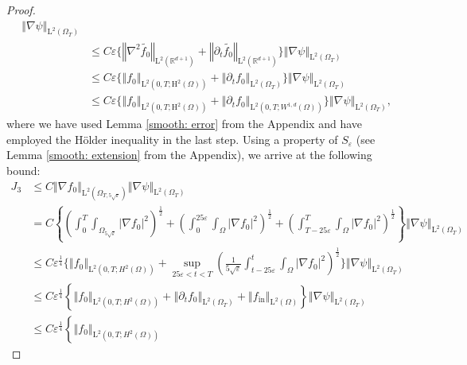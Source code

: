 \documentclass[preprint, 12pt]{amsart}
\numberwithin{equation}{section}
\numberwithin{equation}{section}
\newcommand\RR{\mathbb{R}}
\newcommand{\eps}{\varepsilon}
\begin{document}
\begin{proof}
\begin{equation*}
\begin{aligned}
\left\Vert \nabla \psi \right\Vert_{\mathrm L^2(\Omega_T)}
\\
& \le C \eps \Big\{
\left\Vert \nabla^2 \widetilde{f_0} \right\Vert_{\mathrm L^2(\RR^{d+1})}
+ \left\Vert \partial_t \widetilde{f_0} \right\Vert_{\mathrm L^2(\RR^{d+1})}
\Big\}
\left\Vert \nabla \psi \right\Vert_{\mathrm L^2(\Omega_T)}
\\
& \le C \eps \Big\{
\left\Vert f_0 \right\Vert_{\mathrm L^2(0,T;\mathrm H^2(\Omega))} 
+ \left\Vert \partial_t f_0 \right\Vert_{\mathrm L^2(\Omega_T)}
\Big\}
\left\Vert \nabla \psi \right\Vert_{\mathrm L^2(\Omega_T)} 
\\
& \le C \eps \Big\{
\left\Vert f_0 \right\Vert_{\mathrm L^2(0,T;\mathrm H^2(\Omega))} 
+ \left\Vert \partial_t f_0 \right\Vert_{\mathrm L^2(0,T;W^{1,d}(\Omega))}
\Big\}
\left\Vert \nabla \psi \right\Vert_{\mathrm L^2(\Omega_T)}, 
\end{aligned}
\end{equation*}
where we have used Lemma \ref{smooth: error} from the Appendix and have employed the H\"older inequality in the last step. Using a property of $S_\eps$ (see Lemma \ref{smooth: extension} from the Appendix), we arrive at the following bound:
\begin{equation*}
\begin{aligned}
J_3 & \le 
C \left\Vert \nabla f_0 \right\Vert_{\mathrm L^2(\Omega_{T,5\sqrt{\eps}})}
\left\Vert \nabla \psi \right\Vert_{\mathrm L^2(\Omega_T)}
\\
& = C \left\{ \left( \int_0^T \int_{\Omega_{5\sqrt{\eps}}} \left\vert \nabla f_0 \right\vert^2 \right)^{\frac12}
+ \left( \int_0^{25\eps} \int_\Omega \left\vert \nabla f_0 \right\vert^2 \right)^{\frac12}
+ \left( \int_{T-25\eps}^T \int_\Omega \left\vert \nabla f_0 \right\vert^2 \right)^{\frac12}
\right\}
\left\Vert \nabla \psi \right\Vert_{\mathrm L^2(\Omega_T)}
\\
& \le C \eps^{\frac14} \Bigg\{ \left\Vert f_0 \right\Vert_{\mathrm L^2(0,T;H^2(\Omega))}
+ \sup_{25\eps < t < T} \left(\frac{1}{5\sqrt{\eps}} \int_{t-25\eps}^t \int_\Omega \left\vert \nabla f_0 \right\vert^2 \right)^{\frac12}
\Bigg\} \left\Vert \nabla \psi \right\Vert_{\mathrm L^2(\Omega_T)} 
\\
& \le C \eps^{\frac14} \left\{ \left\Vert f_0 \right\Vert_{\mathrm L^2(0,T;H^2(\Omega))}
+ \left\Vert \partial_t f_0 \right\Vert_{\mathrm L^2(\Omega_T)}
+ \left\Vert  f_{\text{in}} \right\Vert_{\mathrm L^2(\Omega)}
\right\} \left\Vert \nabla \psi \right\Vert_{\mathrm L^2(\Omega_T)} 
\\
& \le C \eps^{\frac14} \left\{ \left\Vert f_0 \right\Vert_{\mathrm L^2(0,T;H^2(\Omega))}

\end{aligned}
\end{equation*}
\end{proof}
\end{document}
